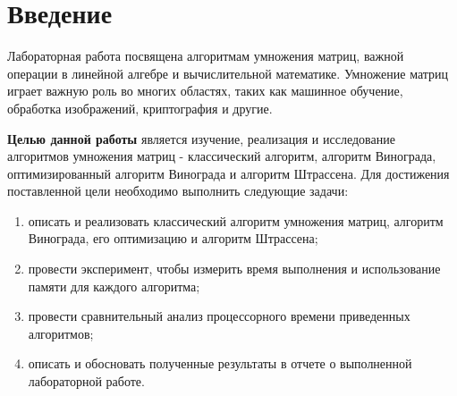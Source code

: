 \chapter*{Введение}

Лабораторная работа посвящена алгоритмам умножения матриц, важной операции в линейной алгебре и вычислительной математике. Умножение матриц играет важную роль во многих областях, таких как машинное обучение, обработка изображений, криптография и другие.

\textbf{Целью данной работы} является изучение, реализация и исследование алгоритмов умножения матриц - классический алгоритм, алгоритм Винограда, оптимизированный алгоритм Винограда и алгоритм Штрассена. 
Для достижения поставленной цели необходимо выполнить следующие задачи:
\begin{enumerate}[label=\arabic*)]
	\item описать и реализовать классический алгоритм умножения матриц, алгоритм Винограда, его оптимизацию и алгоритм Штрассена;
    \item провести эксперимент, чтобы измерить время выполнения и использование памяти для каждого алгоритма;
    \item провести сравнительный анализ процессорного времени приведенных алгоритмов;
	\item описать и обосновать полученные результаты в отчете о выполненной лабораторной работе.
\end{enumerate}

